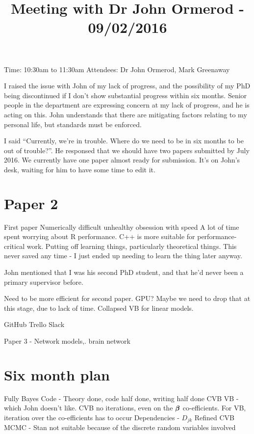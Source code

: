 \documentclass{amsart}
\title{Meeting with Dr John Ormerod - 09/02/2016}
\begin{document}
\maketitle

Time: 10:30am to 11:30am
Attendees: Dr John Ormerod, Mark Greenaway

I raised the issue with John of my lack of progress, and the possibility of my PhD being discontinued if I
don't show substantial progress within six months. Senior people in the department are expressing concern at
my lack of progress, and he is acting on this. John understands that there are mitigating factors relating to
my personal life, but standards must be  enforced.

I said ``Currently, we're in trouble. Where do we need to be in six months to be out of trouble?''. He
responsed that we should have two papers submitted by July 2016. We currently have one paper almost ready for
submission. It's on John's desk, waiting for him to have some time to edit it.

\section{Paper 2}

First paper
Numerically difficult
unhealthy obsession with speed
A lot of time spent worrying about R performance. C++ is more suitable for performance-critical work.
Putting off learning things, particularly theoretical things. This never saved any time - I just ended up 
needing to learn the thing later anyway.

John mentioned that I was his second PhD student, and that he'd never been a primary supervisor before.

Need to be more efficient for second paper.
GPU? Maybe we need to drop that at this stage, due to lack of time.
Collapsed VB for linear models.

GitHub
Trello
Slack

Paper 3 - Network models,. brain network

\section{Six month plan}
Fully Bayes Code - Theory done, code half done, writing half done
CVB
VB - which John doesn't like. CVB no iterations, even on the ${\boldsymbol \beta}$ co-efficients. For VB, iteration over
the co-efficients has to occur
Dependencies - $D_{jk}$
Refined CVB
MCMC - Stan not suitable because of the discrete random variables involved
\end{document}
